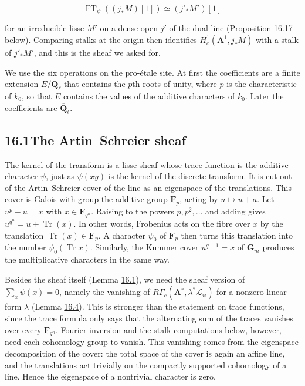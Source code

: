 \documentclass[11pt]{article}
\begin{document}
\[
\operatorname{FT}_\psi((j_*M)[1])\simeq(j'_*M')[1]
\]

for an irreducible lisse \(M'\) on a dense open \(j'\) of the dual line (Proposition \hyperref[bp52]{16.17} below). Comparing stalks at the origin then identifies \(H^1_c(\mathbf A^1,j_*M)\) with a stalk of \(j'_*M'\), and this is the sheaf we asked for.

We use the six operations on the pro-étale site. At first the coefficients are a finite extension \(E/\mathbf Q_\ell\) that contains the \(p\)th roots of unity, where \(p\) is the characteristic of \(k_0\), so that \(E\) contains the values of the additive characters of \(k_0\). Later the coefficients are \(\overline{\mathbf Q}_\ell\).

\subsection*{\texorpdfstring{16.1\quad The Artin–Schreier sheaf}{16.1 The Artin–Schreier sheaf}}
\label{bp3}%
\label{bp4}%
The kernel of the transform is a lisse sheaf whose trace function is the additive character \(\psi\), just as \(\psi(xy)\) is the kernel of the discrete transform. It is cut out of the Artin–Schreier cover of the line as an eigenspace of the translations. This cover is Galois with group the additive group \(\mathbf F_p\), acting by \(u\mapsto u+a\). Let \(u^p-u=x\) with \(x\in\mathbf F_{q^n}\). Raising to the powers \(p,p^2,\ldots\) and adding gives \(u^{q^n}=u+\operatorname{Tr}(x)\). In other words, Frobenius acts on the fibre over \(x\) by the translation \(\operatorname{Tr}(x)\in\mathbf F_p\). A character \(\psi_0\) of \(\mathbf F_p\) then turns this translation into the number \(\psi_0(\operatorname{Tr}x)\). Similarly, the Kummer cover \(u^{q-1}=x\) of \(\mathbf G_m\) produces the multiplicative characters in the same way.

Besides the sheaf itself (Lemma \hyperref[bp5]{16.1}), we need the sheaf version of \(\sum_x\psi(x)=0\), namely the vanishing of \(R\Gamma_c(\mathbf A^r,\lambda^*\mathcal L_\psi)\) for a nonzero linear form \(\lambda\) (Lemma \hyperref[bp13]{16.4}). This is stronger than the statement on trace functions, since the trace formula only says that the alternating sum of the traces vanishes over every \(\mathbf F_{q^n}\). Fourier inversion and the stalk computations below, however, need each cohomology group to vanish. This vanishing comes from the eigenspace decomposition of the cover: the total space of the cover is again an affine line, and the translations act trivially on the compactly supported cohomology of a line. Hence the eigenspace of a nontrivial character is zero.
\end{document}

